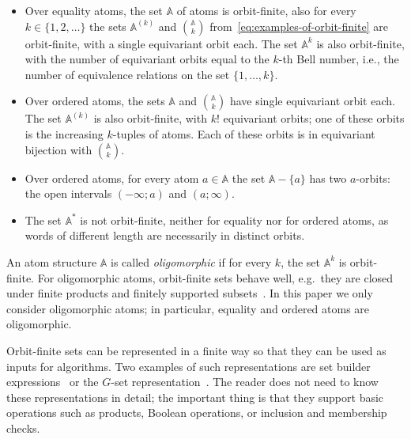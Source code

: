 \documentclass{theoretics}
\newcommand{\set}[1]{\{#1\}}
\newcommand{\atoms}{\mathbb A}
\begin{document}
\begin{example}\label{ex:sets-with-atoms}
\begin{itemize}
\item Over equality atoms, the set $\atoms$ of atoms is orbit-finite, also for every $k \in \set{1,2,\ldots}$ the sets $\atoms^{(k)}$ and $\atoms\choose k$ from~\eqref{eq:examples-of-orbit-finite} are orbit-finite, with a single equivariant orbit each. The set $\atoms^k$ is also orbit-finite, with the number of equivariant orbits equal to the $k$-th Bell number, i.e., the number of equivalence relations on the set $\{1,\ldots,k\}$.
\item Over ordered atoms, the sets $\atoms$ and $\atoms\choose k$ have single equivariant orbit each. The set $\atoms^{(k)}$ is also orbit-finite, with $k!$ equivariant orbits; one of these orbits is the  increasing $k$-tuples of atoms. Each of these orbits is in equivariant bijection with $\atoms\choose k$.
\item Over ordered atoms, for every atom $a \in \atoms$ the set $\atoms - \set{a}$ has two $a$-orbits: the open intervals $(-\infty;a)$  and $(a;\infty)$.
\item The set $\atoms^*$ is not orbit-finite, neither for equality nor for ordered atoms, as words of different length are necessarily in distinct orbits.
\end{itemize}
\end{example}

An atom structure $\atoms$ is called \emph{oligomorphic} if for every $k$, the set $\atoms^k$ is orbit-finite. For oligomorphic atoms, orbit-finite sets behave well, e.g.~they are closed under finite products and finitely supported subsets~\cite[Lem.~3.24]{bojanczyk_slightly2018}. In this paper we only consider oligomorphic atoms; in particular, equality and ordered atoms are oligomorphic.

Orbit-finite sets can be represented in a finite way so that they can be used as inputs for algorithms. Two examples of such representations are set builder expressions~\cite[Sec.~4.1]{bojanczyk_slightly2018} or the $G$-set representation~\cite[Sec.~8]{BKL14}. The reader does not need to know these representations in detail; the important thing is that they support basic operations such as products, Boolean operations, or inclusion and membership checks.  
\end{document}
